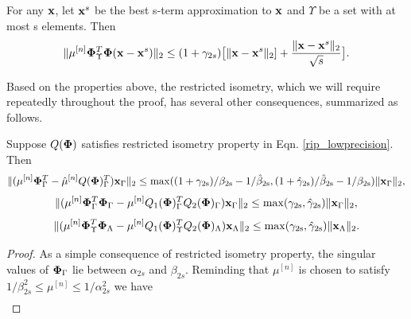 \documentclass[aoas,preprint]{imsart}
\numberwithin{equation}{section}
\theoremstyle{plain}
\begin{document}
{\begin{lemma} \label{residual_lemma}
{\rm{\cite{blumensath2010niht}}}
For any ${\bf x}$, let ${\bf x}^s$ be the best s-term approximation to ${\bf x}$ and $\Upsilon$ be a set with at most s elements. Then
\begin{equation}\label{residual_x_bound}
\|\mu^{[n]}{\bf \Phi}^T_{\Upsilon} {\bf \Phi} ({\bf x}-{\bf x}^s)\|_2 \leq (1+\gamma_{2s})\big [\|{\bf x}-{\bf x}^s\|_2 ]+ \frac{\|{\bf x}-{\bf x}^s\|_2}{\sqrt{s}}\big].
\end{equation}
\end{lemma}
Based on the properties above, the restricted isometry, which we will require repeatedly throughout the proof, has several other consequences, summarized as follows.

\begin{corollary}\label{corollary_auxiliary_results}
Suppose $Q(\boldsymbol{{\bf \Phi}})$ satisfies restricted isometry property in Eqn. \ref{rip_lowprecision}. Then
\begin{equation}\label{mu_phi}
    \| ({\mu}^{[n]}{\bf {\bf \Phi}}_{\Gamma}^T-\hat{\mu}^{[n]}Q({\bf {\bf \Phi}})_{\Gamma}^T){\bf x}_{\Gamma}\|_2 \leq \rm{max}(({1+\gamma_{2s}})/{\beta_{2s}}-{1}/{\hat{\beta}_{2s}}, ({1+\hat{\gamma}_{2s}})/{\hat{\beta}_{2s}}-{1}/{\beta_{2s}})\| {\bf x}_{\Gamma}\|_2,
\end{equation} 
\begin{equation}\label{mu_phi2}
    \|( \mu^{[n]}{\bf \Phi}_{\Gamma}^T\boldsymbol{\Phi}_{\Gamma} - \mu^{[n]}Q_1(\boldsymbol{\Phi})_{\Gamma}^TQ_2(\boldsymbol{\Phi})_{\Gamma}){\bf x}_{\Gamma}\|_2 \leq \rm{max}(\gamma_{2s}, \hat{\gamma}_{2s})\| {\bf x}_{\Gamma}\|_2,
\end{equation}
\begin{equation}\label{mu_phi2_diff}
    \| (\mu^{[n]}\boldsymbol{\Phi}_{\Upsilon}^T\boldsymbol{\Phi}_{\Lambda} - \mu^{[n]}Q_1(\boldsymbol{\Phi})_{\Upsilon}^TQ_2(\boldsymbol{\Phi})_{\Lambda}){\bf x}_{\Lambda}\|_2 \leq \rm{max}(\gamma_{2s}, \hat{\gamma}_{2s})\| {\bf x}_{\Lambda}\|_2.
\end{equation}
\end{corollary}
\begin{proof}
As a simple consequence of restricted isometry property, the singular values of ${\bf \Phi}_{\Gamma}$ lie between $\alpha_{2s}$ and $\beta_{2s}$. Reminding that $\mu^{[n]}$ is chosen to satisfy $1/\beta^2_{2s}\leq \mu^{[n]}\leq 1/\alpha^2_{2s}$ we have
\begin{equation}
\begin{aligned}

\end{aligned}
\end{equation}
\end{proof}}
\end{document}
